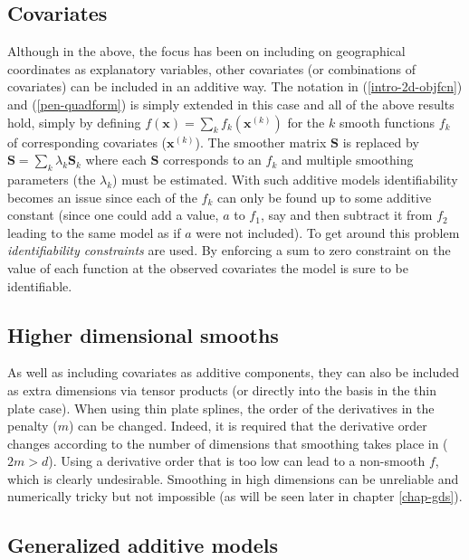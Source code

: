 \subsection{Covariates}

Although in the above, the focus has been on including on geographical coordinates as explanatory variables, other covariates (or combinations of covariates) can be included in an additive way. The notation in (\ref{intro-2d-objfcn}) and (\ref{pen-quadform}) is simply extended in this case and all of the above results hold, simply by defining $f(\mathbf{x})=\sum_k f_k(\mathbf{x}^{(k)})$ for the $k$ smooth functions $f_k$ of corresponding covariates ($\mathbf{x}^{(k)}$). The smoother matrix $\mathbf{S}$ is replaced by $\mathbf{S}= \sum_k \lambda_k \mathbf{S}_k$ where each $\mathbf{S}$ corresponds to an $f_k$ and multiple smoothing parameters (the $\lambda_k$) must be estimated. With such additive models identifiability becomes an issue since each of the $f_k$ can only be found up to some additive constant (since one could add a value, $a$ to $f_1$, say and then subtract it from $f_2$ leading to the same model as if $a$ were not included). To get around this problem \textit{identifiability constraints} are used. By enforcing a sum to zero constraint on the value of each function at the observed covariates the model is sure to be identifiable. 

\subsection{Higher dimensional smooths}

As well as including covariates as additive components, they can also be included as extra dimensions via tensor products (or directly into the basis in the thin plate case). When using thin plate splines, the order of the derivatives in the penalty ($m$) can be changed. Indeed, it is required that the derivative order changes according to the number of dimensions that smoothing takes place in ($2m>d$). Using a derivative order that is too low can lead to a non-smooth $f$, which is clearly undesirable. Smoothing in high dimensions can be unreliable and numerically tricky but not impossible (as will be seen later in chapter \ref{chap-gds}).

\subsection{Generalized additive models}
\label{intro-extending-gams}

